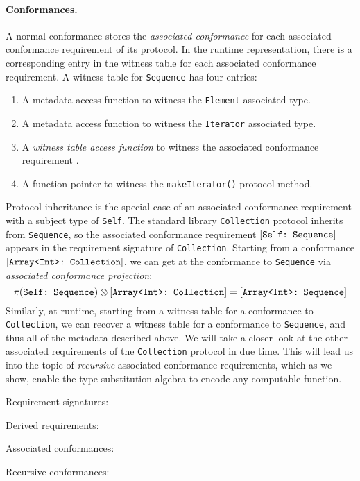 \documentclass[../generics]{subfiles}
\begin{document}
\paragraph{Conformances.}
A normal conformance stores the \emph{associated conformance} for each associated conformance requirement of its protocol. In the runtime representation, there is a corresponding entry in the witness table for each associated conformance requirement. A witness table for \texttt{Sequence} has four entries:
\begin{enumerate}
\item A metadata access function to witness the \texttt{Element} associated type.
\item A metadata access function to witness the \texttt{Iterator} associated type.
\item A \emph{witness table access function} to witness the associated conformance requirement .
\item A function pointer to witness the \texttt{makeIterator()} protocol method.
\end{enumerate}
Protocol inheritance is the special case of an associated conformance requirement with a subject type of \texttt{Self}. The standard library \texttt{Collection} protocol inherits from \texttt{Sequence}, so the associated conformance requirement $[\texttt{Self:~Sequence}]$ appears in the requirement signature of \texttt{Collection}. Starting from a conformance $[\texttt{Array<Int>:~Collection}]$, we can get at the conformance to \texttt{Sequence} via \emph{associated conformance projection}:
\[\pi(\texttt{Self:~Sequence})\otimes[\texttt{Array<Int>:~Collection}]=[\texttt{Array<Int>:~Sequence}]\]
Similarly, at runtime, starting from a witness table for a conformance to \texttt{Collection}, we can recover a witness table for a conformance to \texttt{Sequence}, and thus all of the metadata described above. We will take a closer look at the other associated requirements of the \texttt{Collection} protocol in due time. This will lead us into the topic of \emph{recursive} associated conformance requirements, which as we show, enable the type substitution algebra to encode any computable function.

\begin{MoreDetails}
\item Requirement signatures: 
\item Derived requirements: 
\item Associated conformances: 
\item Recursive conformances: 
\end{MoreDetails}
\end{document}
